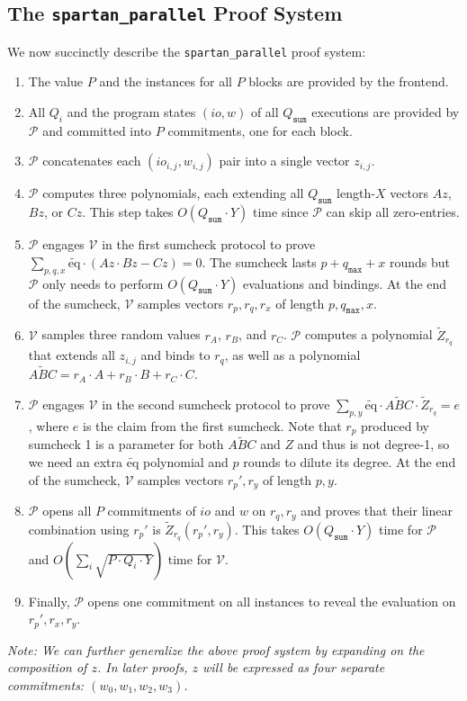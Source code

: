 \documentclass{article}
\newcommand{\code}{\texttt}
\newcommand{\Qsum}{Q_{\mathtt{sum}}}
\newcommand{\qmax}{q_{\mathtt{max}}}
\renewcommand{\P}{\mathcal{P}}
\newcommand{\V}{\mathcal{V}}
\newcommand{\Z}{\widetilde{Z}}
\newcommand{\ABC}{\widetilde{ABC}}
\newcommand{\eq}{\widetilde{\mbox{eq}}}
\begin{document}
\subsection{The \code{spartan\_parallel} Proof System}
We now succinctly describe the \code{spartan\_parallel} proof system:
\begin{enumerate}
    \item The value $P$ and the instances for all $P$ blocks are provided by the frontend.
    \item All $Q_i$ and the program states $(io, w)$ of all $\Qsum$ executions are provided by $\P$ and committed into $P$ commitments, one for each block.
    \item $\P$ concatenates each $(io_{i, j}, w_{i, j})$ pair into a single vector $z_{i, j}$.
    \item $\P$ computes three polynomials, each extending all $\Qsum$ length-$X$ vectors $Az$, $Bz$, or $Cz$. This step takes $O(\Qsum\cdot Y)$ time since $\P$ can skip all zero-entries.
    \item $\P$ engages $\V$ in the first sumcheck protocol to prove $\sum_{p, q, x} \eq\cdot (Az \cdot Bz - Cz) = 0$. The sumcheck lasts $p + \qmax + x$ rounds but $\P$ only needs to perform $O(\Qsum\cdot Y)$ evaluations and bindings. At the end of the sumcheck, $\V$ samples vectors $r_p, r_q, r_x$ of length $p, \qmax, x$.
    \item $\V$ samples three random values $r_A$, $r_B$, and $r_C$. $\P$ computes a polynomial $\Z_{r_q}$ that extends all $z_{i, j}$ and binds to $r_q$, as well as a polynomial $\ABC = r_A\cdot A + r_B\cdot B + r_C\cdot C$.
    \item $\P$ engages $\V$ in the second sumcheck protocol to prove $\sum_{p, y} \eq\cdot \ABC \cdot \Z_{r_q} = e$, where $e$ is the claim from the first sumcheck. Note that 
    $r_p$ produced by sumcheck 1 is a parameter for both $\ABC$ and $Z$ and thus is not degree-1, so we need an extra $\eq$ polynomial and $p$ rounds to dilute its degree. At the end of the sumcheck, $\V$ samples vectors $r_p', r_y$ of length $p, y$.
    \item $\P$ opens all $P$ commitments of $io$ and $w$ on $r_q, r_y$ and proves that their linear combination using $r_p'$ is $\Z_{r_q}(r_p', r_y)$. This takes $O(\Qsum\cdot Y)$ time for $\P$ and $O(\sum_i\sqrt{P\cdot Q_i\cdot Y})$ time for $\V$.
    \item Finally, $\P$ opens one commitment on all instances to reveal the evaluation on $r_p', r_x, r_y$.
\end{enumerate}
\emph{Note: We can further generalize the above proof system by expanding on the composition of $z$. In later proofs, $z$ will be expressed as four separate commitments: $(w_0, w_1, w_2, w_3)$.}
\end{document}
